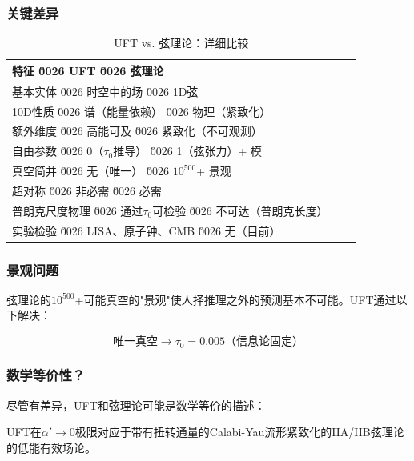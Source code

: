 \subsubsection{关键差异}

\begin{table}[htbp]
\centering
\caption{UFT vs. 弦理论：详细比较}
\begin{tabular}{@{}lcc@{}}
\toprule
\textbf{特征} \u0026 \textbf{UFT} \u0026 \textbf{弦理论} \\
\midrule
基本实体 \u0026 时空中的场 \u0026 1D弦 \\
10D性质 \u0026 谱（能量依赖） \u0026 物理（紧致化） \\
额外维度 \u0026 高能可及 \u0026 紧致化（不可观测） \\
自由参数 \u0026 0（$\tau_0$推导） \u0026 1（弦张力）+ 模 \\
真空简并 \u0026 无（唯一） \u0026 $10^{500}$+ 景观 \\
超对称 \u0026 非必需 \u0026 必需 \\
普朗克尺度物理 \u0026 通过$\tau_0$可检验 \u0026 不可达（普朗克长度） \\
实验检验 \u0026 LISA、原子钟、CMB \u0026 无（目前） \\
\bottomrule
\end{tabular}
\label{tab:string_comparison}
\end{table}

\subsubsection{景观问题}

弦理论的$10^{500}$+可能真空的"景观"使人择推理之外的预测基本不可能。UFT通过以下解决：

\begin{equation}
    \text{唯一真空} \rightarrow \tau_0 = 0.005 \text{（信息论固定）}
\end{equation}

\subsubsection{数学等价性？}

尽管有差异，UFT和弦理论可能是数学等价的描述：

\begin{conjecture}
UFT在$\alpha' \to 0$极限对应于带有扭转通量的Calabi-Yau流形紧致化的IIA/IIB弦理论的低能有效场论。
\end{conjecture}

